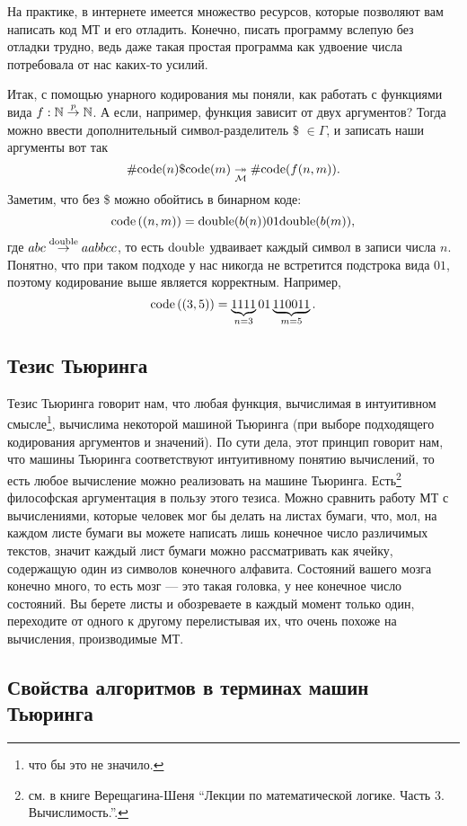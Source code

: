 На практике, в интернете имеется множество ресурсов, которые позволяют вам написать код МТ и его отладить.
Конечно, писать программу вслепую без отладки трудно, ведь даже такая простая программа как удвоение числа потребовала от нас каких-то усилий.

Итак, с помощью унарного кодирования мы поняли, как работать с функциями вида $f: \mathbb{N} \overset{p}{\to} \mathbb{N}$.
А если, например, функция зависит от двух аргументов?
Тогда можно ввести дополнительный символ-разделитель \$ $\in \Gamma$, и записать наши аргументы вот так
$$
    \# \mathrm{code}(n) \$ \mathrm{code}(m) \underset{\mathcal{M}}{\twoheadrightarrow} \# \mathrm{code}(f(n, m)).
$$
Заметим, что без \$ можно обойтись в бинарном коде:
$$
    \mathrm{code}\left(\left(n, m\right)\right) = \mathrm{double}(b(n))01\mathrm{double}(b(m)),
$$
где $abc \overset{\mathrm{double}}{\to} aabbcc$, то есть $\mathrm{double}$ удваивает каждый символ в записи числа $n$.
Понятно, что при таком подходе у нас никогда не встретится подстрока вида $01$, поэтому кодирование выше является корректным.
Например,
$$
    \mathrm{code}\left((3, 5)\right) = \underbrace{1111}_{n = 3}01\underbrace{110011}_{m = 5}.
$$

\subsection{Тезис Тьюринга}

Тезис Тьюринга говорит нам, что любая функция, вычислимая в интуитивном смысле\footnote{что бы это не значило.}, вычислима некоторой машиной Тьюринга (при выборе подходящего кодирования аргументов и значений).
По сути дела, этот принцип говорит нам, что машины Тьюринга соответствуют интуитивному понятию вычислений, то есть любое вычисление можно реализовать на машине Тьюринга.
Есть\footnote{см. в книге Верещагина-Шеня \enquote{Лекции по математической логике. Часть 3. Вычислимость.}.} философская аргументация в пользу этого тезиса.
Можно сравнить работу МТ с вычислениями, которые человек мог бы делать на листах бумаги, что, мол, на каждом листе бумаги вы можете написать лишь конечное число различимых текстов, значит каждый лист бумаги можно рассматривать как ячейку, содержащую один из символов конечного алфавита.
Состояний вашего мозга конечно много, то есть мозг --- это такая головка, у нее конечное число состояний.
Вы берете листы и обозреваете в каждый момент только один, переходите от одного к другому перелистывая их, что очень похоже на вычисления, производимые МТ.

\subsection{Свойства алгоритмов в терминах машин Тьюринга}

